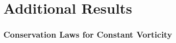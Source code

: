 \section{Additional Results}

\begin{frame}[t]\frametitle{Conservation Laws for Constant Vorticity}
    \begin{overlayarea}{\textwidth}{.3\textheight}
        \begin{center}
        \end{center}
    \end{overlayarea}
    \begin{overlayarea}{\textwidth}{.7\textheight}
\end{overlayarea}
\end{frame}

